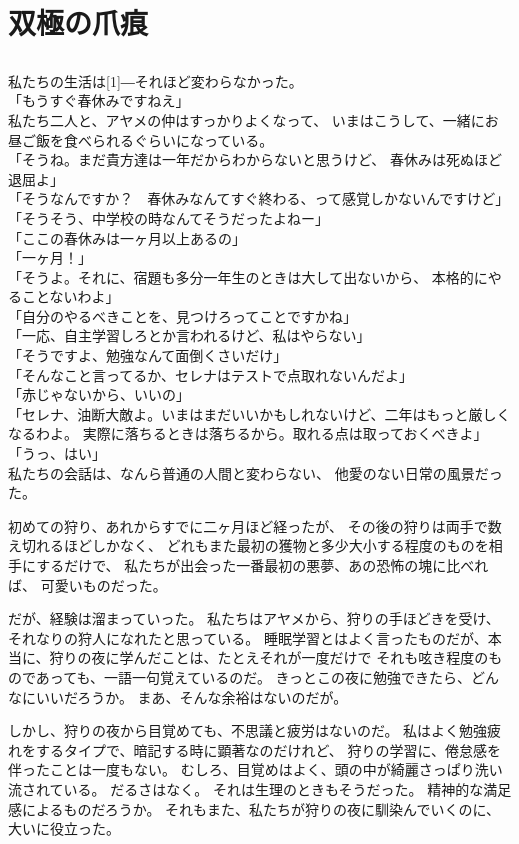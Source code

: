 \documentclass[../IHMain]{subfiles}
\begin{document}
\chapter{双極の爪痕}
\section{}
私たちの生活は\scalebox{3}[1]{―}それほど変わらなかった。\\
「もうすぐ春休みですねえ」\\
私たち二人と、アヤメの仲はすっかりよくなって、
いまはこうして、一緒にお昼ご飯を食べられるぐらいになっている。\\
「そうね。まだ貴方達は一年だからわからないと思うけど、
春休みは死ぬほど退屈よ」\\
「そうなんですか？　春休みなんてすぐ終わる、って感覚しかないんですけど」\\
「そうそう、中学校の時なんてそうだったよねー」\\
「ここの春休みは一ヶ月以上あるの」\\
「一ヶ月！」\\
「そうよ。それに、宿題も多分一年生のときは大して出ないから、
本格的にやることないわよ」\\
「自分のやるべきことを、見つけろってことですかね」\\
「一応、自主学習しろとか言われるけど、私はやらない」\\
「そうですよ、勉強なんて面倒くさいだけ」\\
「そんなこと言ってるか、セレナはテストで点取れないんだよ」\\
「赤じゃないから、いいの」\\
「セレナ、油断大敵よ。いまはまだいいかもしれないけど、二年はもっと厳しくなるわよ。
実際に落ちるときは落ちるから。取れる点は取っておくべきよ」\\
「うっ、はい」\\
私たちの会話は、なんら普通の人間と変わらない、
他愛のない日常の風景だった。

初めての狩り、あれからすでに二ヶ月ほど経ったが、
その後の狩りは両手で数え切れるほどしかなく、
どれもまた最初の獲物と多少大小する程度のものを相手にするだけで、
私たちが出会った一番最初の悪夢、あの恐怖の塊に比べれば、
可愛いものだった。

だが、経験は溜まっていった。
私たちはアヤメから、狩りの手ほどきを受け、それなりの狩人になれたと思っている。
睡眠学習とはよく言ったものだが、本当に、狩りの夜に学んだことは、たとえそれが一度だけで
それも呟き程度のものであっても、一語一句覚えているのだ。
きっとこの夜に勉強できたら、どんなにいいだろうか。
まあ、そんな余裕はないのだが。

しかし、狩りの夜から目覚めても、不思議と疲労はないのだ。
私はよく勉強疲れをするタイプで、暗記する時に顕著なのだけれど、
狩りの学習に、倦怠感を伴ったことは一度もない。
むしろ、目覚めはよく、頭の中が綺麗さっぱり洗い流されている。
だるさはなく。
それは生理のときもそうだった。
精神的な満足感によるものだろうか。
それもまた、私たちが狩りの夜に馴染んでいくのに、大いに役立った。
\end{document}
